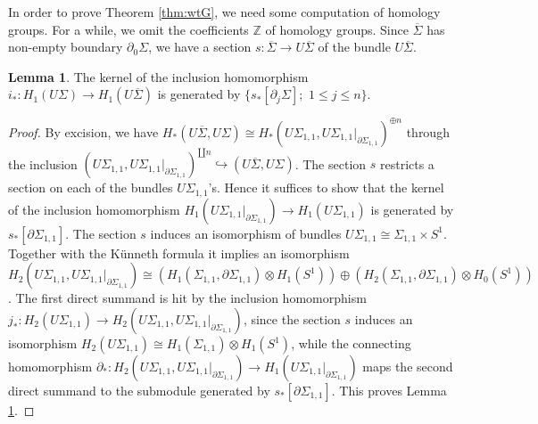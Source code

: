 \documentclass[a4paper,12pt, twoside]{amsart}
\theoremstyle{definition}
\newtheorem{lem}[dfn]{Lemma}
\theoremstyle{remark}
\numberwithin{equation}{section}
\newcommand\bZ{{\mathbb{Z}}}
\newcommand\pa{\partial}
\begin{document}
In order to prove Theorem \ref{thm:wtG}, we need some computation of homology groups.
For a while, we omit the coefficients $\bZ$ of homology groups.
Since $\overline{\Sigma}$ has non-empty boundary $\pa_0\Sigma$, we have a section $s: \overline{\Sigma} \to U\overline{\Sigma}$ of the bundle $U\overline{\Sigma}$. 
\begin{lem}\label{lem:kernel} The kernel of the inclusion homomorphism $i_*: H_1(U\Sigma) \to H_1(U\overline{\Sigma})$ is generated by $\{s_*[\pa_j\Sigma]; \,\, 1 \leq j \leq n\}$. 
\end{lem}
\begin{proof}%
By excision, we have $H_*(U\overline{\Sigma}, U\Sigma) \cong H_*(U\Sigma_{1,1}, U\Sigma_{1,1}\vert_{\pa\Sigma_{1,1}})^{\oplus n}$ through the inclusion $(U\Sigma_{1,1}, U\Sigma_{1,1}\vert_{\pa\Sigma_{1,1}})^{\amalg n} \hookrightarrow (U\overline{\Sigma}, U\Sigma)$. 
The section $s$ restricts a section on each of the bundles $U\Sigma_{1,1}$'s. 
Hence it suffices to show that the kernel of the inclusion homomorphism $H_1(U\Sigma_{1,1}\vert_{\pa\Sigma_{1,1}}) \to H_1(U\Sigma_{1,1})$ is generated by $s_*[\pa\Sigma_{1,1}]$. The section $s$ induces an isomorphism of bundles $U\Sigma_{1,1} \cong \Sigma_{1,1}\times S^1$. Together with the K\"unneth formula it implies an isomorphism 
$H_2(U\Sigma_{1,1}, U\Sigma_{1,1}\vert_{\pa\Sigma_{1,1}}) \cong (H_1(\Sigma_{1,1}, \pa\Sigma_{1,1})\otimes H_1(S^1)) \oplus (H_2(\Sigma_{1,1}, \pa\Sigma_{1,1})\otimes H_0(S^1))$. 
The first direct summand is hit by the inclusion homomorphism $j_*: H_2(U\Sigma_{1,1}) \to H_2(U\Sigma_{1,1}, U\Sigma_{1,1}\vert_{\pa\Sigma_{1,1}})$, 
since the section $s$ induces an isomorphism $H_2(U\Sigma_{1,1}) \cong H_1(\Sigma_{1,1})\otimes H_1(S^1)$, 
while the connecting homomorphism $\partial_*: H_2(U\Sigma_{1,1}, U\Sigma_{1,1}\vert_{\pa\Sigma_{1,1}}) \to H_1(U\Sigma_{1,1}\vert_{\pa\Sigma_{1,1}})$ maps the second direct summand to the submodule generated by $s_*[\pa\Sigma_{1,1}]$. This proves Lemma \ref{lem:kernel}. 
\end{proof}
\end{document}
